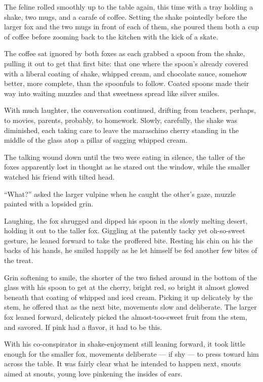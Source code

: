 The feline rolled smoothly up to the table again, this time with a tray holding a shake, two mugs, and a carafe of coffee. Setting the shake pointedly before the larger fox and the two mugs in front of each of them, she poured them both a cup of coffee before zooming back to the kitchen with the kick of a skate.

The coffee sat ignored by both foxes as each grabbed a spoon from the shake, pulling it out to get that first bite: that one where the spoon's already covered with a liberal coating of shake, whipped cream, and chocolate sauce, somehow better, more complete, than the spoonfuls to follow. Coated spoons made their way into waiting muzzles and that sweetness spread like silver smiles.

With much laughter, the conversation continued, drifting from teachers, perhaps, to movies, parents, probably, to homework. Slowly, carefully, the shake was diminished, each taking care to leave the maraschino cherry standing in the middle of the glass atop a pillar of sagging whipped cream.

The talking wound down until the two were eating in silence, the taller of the foxes apparently lost in thought as he stared out the window, while the smaller watched his friend with tilted head.

``What?'' asked the larger vulpine when he caught the other's gaze, muzzle painted with a lopsided grin.

Laughing, the fox shrugged and dipped his spoon in the slowly melting desert, holding it out to the taller fox. Giggling at the patently tacky yet oh-so-sweet gesture, he leaned forward to take the proffered bite. Resting his chin on his the backs of his hands, he smiled happily as he let himself be fed another few bites of the treat.

Grin softening to smile, the shorter of the two fished around in the bottom of the glass with his spoon to get at the cherry, bright red, so bright it almost glowed beneath that coating of whipped and iced cream. Picking it up delicately by the stem, he offered that as the next bite, movements slow and deliberate. The larger fox leaned forward, delicately picked the almost-too-sweet fruit from the stem, and savored. If pink had a flavor, it had to be this.

With his co-conspirator in shake-enjoyment still leaning forward, it took little enough for the smaller fox, movements deliberate --- if shy --- to press toward him across the table. It was fairly clear what he intended to happen next, snouts aimed at snouts, young love pinkening the insides of ears.

